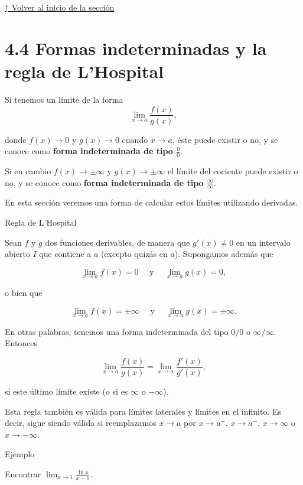 \documentclass[
  letterpaper,
]{book}
\theoremstyle{plain}
\theoremstyle{remark}
\begin{document}
\hyperref[seccion_4.3]{↑ Volver al inicio de la sección}

\section{4.4 Formas indeterminadas y la regla de
L'Hospital}\label{seccion_4.4}

Si tenemos un límite de la forma \[
\lim_{x\to a} \frac{f(x)}{g(x)},
\]

donde \(f(x)\to 0\) y \(g(x)\to 0\) cuando \(x\to a\), éste puede
existir o no, y se conoce como \textbf{forma indeterminada de tipo
\(\displaystyle \frac{0}{0}\)}.

Si en cambio \(f(x)\to \pm\infty\) y \(g(x)\to \pm\infty\) el límite del
cociente puede existir o no, y se conoce como \textbf{forma
indeterminada de tipo \(\displaystyle \frac{\infty}{\infty}\)}.

En esta sección veremos una forma de calcular estos límites utilizando
derivadas.

\label{teo-regla-LH}
Regla de L'Hospital

Sean \(f\) y \(g\) dos funciones derivables, de manera que
\(g'(x)\neq 0\) en un intervalo abierto \(I\) que contiene a \(a\)
(excepto quizás en \(a\)). Supongamos además que

\[
\lim_{x\to a}f(x)=0\quad \text{ y }\quad \lim_{x\to a}g(x)=0,
\]

o bien que

\[
\lim_{x\to a}f(x)=\pm \infty\quad \text{ y }\quad \lim_{x\to a}g(x)=\pm\infty.
\]

En otras palabras, tenemos una forma indeterminada del tipo \(0/0\) o
\(\infty/\infty\). Entonces

\[
\lim_{x\to a}\frac{f(x)}{g(x)}=\lim_{x\to a}\frac{f'(x)}{g'(x)},
\]

si este último límite existe (o si es \(\infty\) o \(-\infty\)).

Esta regla también es válida para límites laterales y límites en el
infinito. Es decir, sigue siendo válida si reemplazamos \(x\to a\) por
\(x\to a^+\), \(x\to a^-\), \(x\to\infty\) o \(x\to -\infty\).

Ejemplo

Encontrar \(\displaystyle \lim_{x\to 1} \frac{\ln x}{x-1}\).
\end{document}
